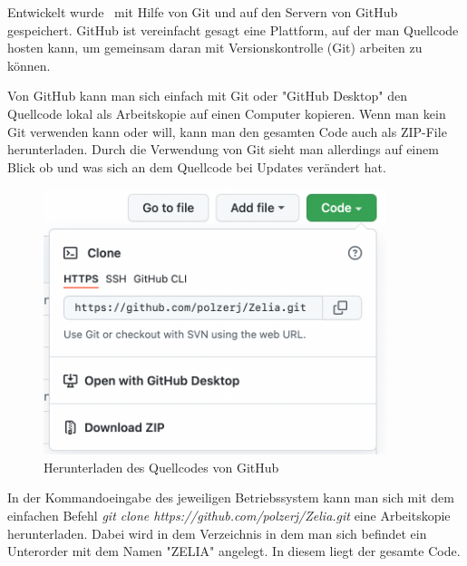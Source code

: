 
Entwickelt wurde \ZELIA\ mit Hilfe von Git und auf den Servern von GitHub gespeichert. GitHub ist vereinfacht gesagt eine Plattform, auf der man Quellcode hosten kann, um gemeinsam daran mit Versionskontrolle (Git) arbeiten zu können. 

Von GitHub kann man sich einfach mit Git oder "GitHub Desktop" den Quellcode lokal als Arbeitskopie auf einen Computer kopieren. Wenn man kein Git verwenden kann oder will, kann man den gesamten Code auch als ZIP-File herunterladen. Durch die Verwendung von Git sieht man allerdings auf einem Blick ob und was sich an dem Quellcode bei Updates verändert hat.

\begin{figure}[H]
    \centering
    \includegraphics[width=100mm]{media/Handbuch/GitHub_Download.png}
    \caption{Herunterladen des Quellcodes von GitHub}
\end{figure}


In der Kommandoeingabe des jeweiligen Betriebssystem kann man sich mit dem einfachen Befehl \emph{git clone https://github.com/polzerj/Zelia.git} eine Arbeitskopie herunterladen. Dabei wird in dem Verzeichnis in dem man sich befindet ein Unterorder mit dem Namen "ZELIA" angelegt. In diesem liegt der gesamte Code.

